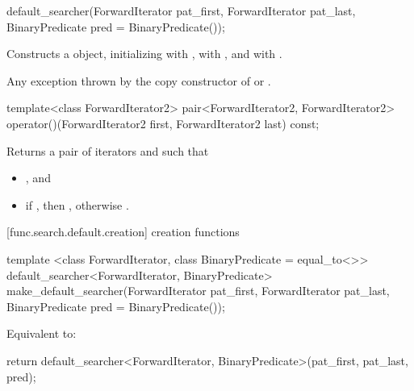 %
\begin{itemdecl}
default_searcher(ForwardIterator pat_first, ForwardIterator pat_last,
                 BinaryPredicate pred = BinaryPredicate());
\end{itemdecl}

\begin{itemdescr}
\pnum
\effects
Constructs a  object, initializing 
with , \mbox{} with , and
 with .

\pnum
\throws
Any exception thrown by the copy constructor of  or
.
\end{itemdescr}

%
\begin{itemdecl}
template<class ForwardIterator2>
  pair<ForwardIterator2, ForwardIterator2>
    operator()(ForwardIterator2 first, ForwardIterator2 last) const;
\end{itemdecl}

\begin{itemdescr}
\pnum
\effects
Returns a pair of iterators  and  such that
\begin{itemize}
\item {}, and
\item if , then ,
otherwise .
\end{itemize}
\end{itemdescr}

[func.search.default.creation]{ creation functions}

%
\begin{itemdecl}
template <class ForwardIterator, class BinaryPredicate = equal_to<>>
  default_searcher<ForwardIterator, BinaryPredicate>
    make_default_searcher(ForwardIterator pat_first, ForwardIterator pat_last,
                          BinaryPredicate pred = BinaryPredicate());
\end{itemdecl}

\begin{itemdescr}
\pnum
\effects
Equivalent to:
\begin{codeblock}
return default_searcher<ForwardIterator, BinaryPredicate>(pat_first, pat_last, pred);
\end{codeblock}
\end{itemdescr}

